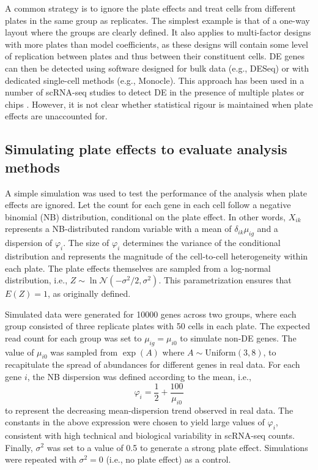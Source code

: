 \documentclass[oupdraft]{bio}
\begin{document}
A common strategy is to ignore the plate effects and treat cells from different plates in the same group as replicates.
The simplest example is that of a one-way layout where the groups are clearly defined.
It also applies to multi-factor designs with more plates than model coefficients, as these designs will contain some level of replication between plates and thus between their constituent cells.
DE genes can then be detected using software designed for bulk data (e.g., DESeq) or with dedicated single-cell methods (e.g., Monocle).
This approach has been used in a number of scRNA-seq studies to detect DE in the presence of multiple plates or chips \citep{kolod2015single,gaublomme2015single,kowalczyk2015single}.
However, it is not clear whether statistical rigour is maintained when plate effects are unaccounted for.

\subsection{Simulating plate effects to evaluate analysis methods}
A simple simulation was used to test the performance of the analysis when plate effects are ignored.
Let the count for each gene in each cell follow a negative binomial (NB) distribution, conditional on the plate effect.
In other words, $X_{ik}$ represents a NB-distributed random variable with a mean of $\delta_{ik}\mu_{ig}$ and a dispersion of $\varphi_{i}$.
The size of $\varphi_{i}$ determines the variance of the conditional distribution and represents the magnitude of the cell-to-cell heterogeneity within each plate.
The plate effects themselves are sampled from a log-normal distribution, i.e., $Z \sim \ln \mathcal{N}(-\sigma^2/2, \sigma^2)$.
This parametrization ensures that $E(Z)=1$, as originally defined.

Simulated data were generated for 10000 genes across two groups, where each group consisted of three replicate plates with 50 cells in each plate.
The expected read count for each group was set to $\mu_{ig}=\mu_{i0}$ to simulate non-DE genes.
The value of $\mu_{i0}$ was sampled from $\exp(A)$ where $A \sim \mbox{Uniform}(3, 8)$, to recapitulate the spread of abundances for different genes in real data. 
For each gene $i$, the NB dispersion was defined according to the mean, i.e., 
\[
    \varphi_{i} = \frac{1}{2} + \frac{100}{\mu_{i0}} 
\]
to represent the decreasing mean-dispersion trend observed in real data.
The constants in the above expression were chosen to yield large values of $\varphi_{i}$, consistent with high technical and biological variability in scRNA-seq counts.
Finally, $\sigma^2$ was set to a value of 0.5 to generate a strong plate effect.
Simulations were repeated with $\sigma^2=0$ (i.e., no plate effect) as a control. 
\end{document}
